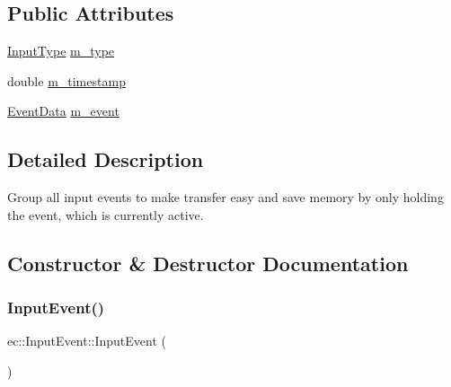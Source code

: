 \subsection*{Public Attributes}
\begin{DoxyCompactItemize}
\item 
\mbox{\hyperlink{namespaceec_ae2d697393ea83b34b18ab14eb5dacbca}{Input\+Type}} \mbox{\hyperlink{structec_1_1_input_event_a07aadaf18da2952478b803bbd4122bb7}{m\+\_\+type}}
\item 
double \mbox{\hyperlink{structec_1_1_input_event_ada54908facf585cb714bd6712d8f6c4d}{m\+\_\+timestamp}}
\item 
\mbox{\hyperlink{unionec_1_1_event_data}{Event\+Data}} \mbox{\hyperlink{structec_1_1_input_event_a10c6d0183b009da26bac115528c3da36}{m\+\_\+event}}
\end{DoxyCompactItemize}


\subsection{Detailed Description}
Group all input events to make transfer easy and save memory by only holding the event, which is currently active. 

\subsection{Constructor \& Destructor Documentation}
\mbox{\label{structec_1_1_input_event_a0e1dd98eb4e1161bdb573afe429d07c8}} 
\subsubsection{\texorpdfstring{Input\+Event()}{InputEvent()}\hspace{0.1cm}{\footnotesize\ttfamily [1/2]}}
{\footnotesize\ttfamily ec\+::\+Input\+Event\+::\+Input\+Event (\begin{DoxyParamCaption}{ }\end{DoxyParamCaption})\hspace{0.3cm}{\ttfamily [explicit]}}

\mbox{\label{structec_1_1_input_event_af8894b724a61a63412f4e6df14a49d7a}} 
